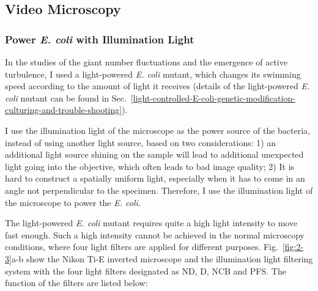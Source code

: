 \subsection{Video Microscopy}

\subsubsection{Power \textit{E. coli} with Illumination Light}
In the studies of the giant number fluctuations and the emergence of active turbulence, I used a light-powered \textit{E. coli} mutant, which changes its swimming speed according to the amount of light it receives (details of the light-powered \textit{E. coli} mutant can be found in Sec.~\ref{light-controlled-E-coli-genetic-modification-culturing-and-trouble-shooting}).

I use the illumination light of the microscope as the power source of the bacteria, instead of using another light source, based on two considerations: 1) an additional light source shining on the sample will lead to additional unexpected light going into the objective, which often leads to bad image quality; 2) It is hard to construct a spatially uniform light, especially when it has to come in an angle not perpendicular to the specimen. Therefore, I use the illumination light of the microscope to power the \textit{E. coli}.

The light-powered \textit{E. coli} mutant requires quite a high light intensity to move fast enough. Such a high intensity cannot be achieved in the normal microscopy conditions, where four light filters are applied for different purposes. Fig.~\ref{fig:2-3}a-b show the Nikon Ti-E inverted microscope and the illumination light filtering system with the four light filters designated as ND, D, NCB and PFS. The function of the filters are listed below:

